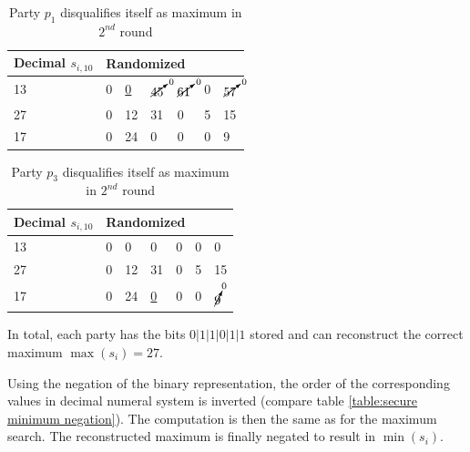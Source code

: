 		\begin{table}[!htb]
			\centering
			\caption{Party $p_1$ disqualifies itself as maximum in $2^{nd}$ round}
			\label{table:secure maximum p1 not maximum}
			\begin{tabular}{|l|l|l|l|l|l|l|}
				\hline
				Decimal $s_{i,10}$ & \multicolumn{6}{l|}{Randomized} \\ \hline
				13                 & 0    & \underline{0}    & $\cancelto{0}{45}$    & $\cancelto{0}{61}$    & 0   & $\cancelto{0}{57}$   \\ \hline
				27                 & 0    & 12    & 31    & 0    & 5   & 15   \\ \hline
				17                 & 0    & 24    & 0    & 0    & 0   & 9   \\ \hline
			\end{tabular}
		\end{table}

		\begin{table}[!htb]
			\centering
			\caption{Party $p_3$ disqualifies itself as maximum in $2^{nd}$ round}
			\label{table:secure maximum p3 not maximum}
			\begin{tabular}{|l|l|l|l|l|l|l|}
				\hline
				Decimal $s_{i,10}$ & \multicolumn{6}{l|}{Randomized} \\ \hline
				13                 & 0    & 0    & 0    & 0    & 0   & 0   \\ \hline
				27                 & 0    & 12    & 31    & 0    & 5   & 15   \\ \hline
				17                 & 0    & 24    & \underline{0}    & 0    & 0   & $\cancelto{0}{9}$   \\ \hline
			\end{tabular}
		\end{table}

		In total, each party has the bits $0|1|1|0|1|1$ stored and can reconstruct the correct maximum $\max(s_i)=27$.
		
		Using the negation of the binary representation, the order of the corresponding values in decimal numeral system is inverted (compare table \ref{table:secure minimum negation}). The computation is then the same as for the maximum search. The reconstructed maximum is finally negated to result in $\min(s_i)$.
		
